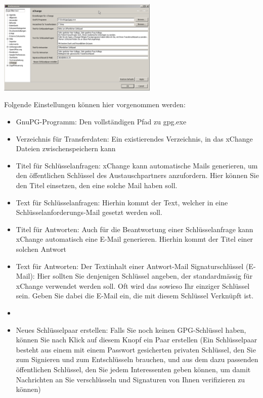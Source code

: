 \includegraphics[width=3in]{images/xc1.png}

Folgende Einstellungen können hier vorgenommen werden:
\begin{itemize}
 \item GnuPG-Programm: Den vollständigen Pfad zu gpg.exe
\item Verzeichnis für Transferdaten: Ein existierendes Verzeichnis, in das xChange Dateien zwischenspeichern kann
\item Titel für Schlüsselanfragen: xChange kann automatische Mails generieren, um  den öffentlichen Schlüssel des Austauschpartners anzufordern. Hier können Sie den Titel einsetzen, den eine solche Mail haben soll.
\item Text für Schlüsselanfragen: Hierhin kommt der Text, welcher in eine Schlüsselanforderungs-Mail gesetzt werden soll.
\item Titel für Antworten: Auch für die Beantwortung einer Schlüsselanfrage kann xChange automatisch eine E-Mail generieren. Hierhin kommt der Titel einer solchen Antwort
\item Text für Antworten: Der Textinhalt einer Antwort-Mail
Signaturschlüssel (E-Mail): Hier sollten Sie denjenigen Schlüssel angeben, der standardmässig für xChange verwendet werden soll. Oft wird das sowieso Ihr einziger Schlüssel sein. Geben Sie dabei die E-Mail ein, die mit diesem Schlüssel Verknüpft ist.

\item
\item Neues Schlüsselpaar erstellen: Falls Sie noch keinen GPG-Schlüssel haben, können Sie nach Klick auf diesem Knopf ein Paar erstellen (Ein Schlüsselpaar besteht aus einem mit einem Passwort gesicherten privaten Schlüssel, den Sie zum Signieren und zum Entschlüsseln brauchen, und aus dem dazu passenden öffentlichen Schlüssel, den Sie jedem Interessenten geben können, um damit Nachrichten an Sie verschlüsseln und Signaturen von Ihnen verifizieren zu können)

\end{itemize}

